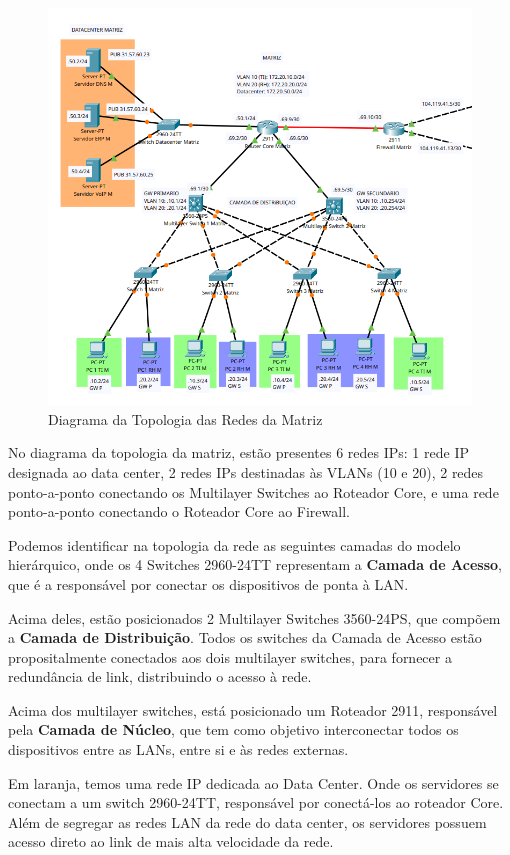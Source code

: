 \documentclass[a4paper, 12pt]{article}
\begin{document}
\begin{figure}[H]
    \centering
    \includegraphics[width=0.8\linewidth]{matriz.png}
    \caption{Diagrama da Topologia das Redes da Matriz}
    \label{fig:matriz}
\end{figure}

No diagrama da topologia da matriz, estão presentes 6 redes IPs: 1 rede IP designada ao data center, 2 redes IPs destinadas às VLANs (10 e 20), 2 redes ponto-a-ponto conectando os Multilayer Switches ao Roteador Core, e uma rede ponto-a-ponto conectando o Roteador Core ao Firewall.

Podemos identificar na topologia da rede as seguintes camadas do modelo hierárquico, onde os 4 Switches 2960-24TT representam a \textbf{Camada de Acesso}, que é a responsável por conectar os dispositivos de ponta à LAN.

Acima deles, estão posicionados 2 Multilayer Switches 3560-24PS, que compõem a \textbf{Camada de Distribuição}. Todos os switches da Camada de Acesso estão propositalmente conectados aos dois multilayer switches, para fornecer a redundância de link, distribuindo o acesso à rede.

Acima dos multilayer switches, está posicionado um Roteador 2911, responsável pela \textbf{Camada de Núcleo}, que tem como objetivo interconectar todos os dispositivos entre as LANs, entre si e às redes externas.

Em laranja, temos uma rede IP dedicada ao Data Center. Onde os servidores se conectam a um switch 2960-24TT, responsável por conectá-los ao roteador Core. Além de segregar as redes LAN da rede do data center, os servidores possuem acesso direto ao link de mais alta velocidade da rede.
\end{document}
